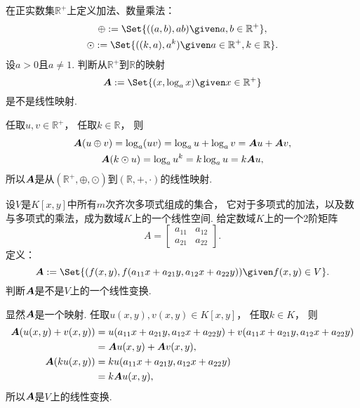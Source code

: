 \begin{example}
在正实数集\(\mathbb{R}^+\)上定义加法、数量乘法：\begin{gather*}
	\oplus \defeq \Set{
		((a,b),ab)
		\given
		a,b \in \mathbb{R}^+
	}, \\
	\odot \defeq \Set{
		((k,a),a^k)
		\given
		a \in \mathbb{R}^+,
		k \in \mathbb{R}
	}.
\end{gather*}
设\(a>0\)且\(a\neq1\).
判断从\(\mathbb{R}^+\)到\(\mathbb{R}\)的映射\begin{equation*}
	\vb{A} \defeq \Set{
		(x,\log_a x)
		\given
		x \in \mathbb{R}^+
	}
\end{equation*}是不是线性映射.
\begin{solution}
任取\(u,v\in\mathbb{R}^+\)，
任取\(k\in\mathbb{R}\)，
则\begin{gather*}
	\boldsymbol{A}(u \oplus v)
	= \log_a (u v)
	= \log_a u + \log_a v
	= \boldsymbol{A}u + \boldsymbol{A}v, \\
	\boldsymbol{A}(k \odot u)
	= \log_a u^k
	= k \log_a u
	= k \boldsymbol{A}u,
\end{gather*}
所以\(\boldsymbol{A}\)是从\((\mathbb{R}^+,\oplus,\odot)\)到\((\mathbb{R},+,\cdot)\)的线性映射.
\end{solution}
\end{example}

\begin{example}
设\(V\)是\(K[x,y]\)中所有\(m\)次齐次多项式组成的集合，
它对于多项式的加法，以及数与多项式的乘法，成为数域\(K\)上的一个线性空间.
给定数域\(K\)上的一个2阶矩阵\begin{equation*}
	A = \begin{bmatrix}
		a_{11} & a_{12} \\
		a_{21} & a_{22}
	\end{bmatrix}.
\end{equation*}
定义：\begin{equation*}
	\vb{A} \defeq \Set{
		(f(x,y),f(a_{11}x+a_{21}y,a_{12}x+a_{22}y))
		\given
		f(x,y) \in V
	}.
\end{equation*}
判断\(\boldsymbol{A}\)是不是\(V\)上的一个线性变换.
\begin{solution}
显然\(\boldsymbol{A}\)是一个映射.
任取\(u(x,y),v(x,y) \in K[x,y]\)，
任取\(k \in K\)，
则\begin{align*}
	\boldsymbol{A}(u(x,y) + v(x,y))
	&= u(a_{11}x+a_{21}y,a_{12}x+a_{22}y) + v(a_{11}x+a_{21}y,a_{12}x+a_{22}y) \\
	&= \boldsymbol{A}u(x,y) + \boldsymbol{A}v(x,y), \\
	\boldsymbol{A}(k u(x,y))
	&= k u(a_{11}x+a_{21}y,a_{12}x+a_{22}y) \\
	&= k \boldsymbol{A}u(x,y),
\end{align*}
所以\(\boldsymbol{A}\)是\(V\)上的线性变换.
\end{solution}
\end{example}

